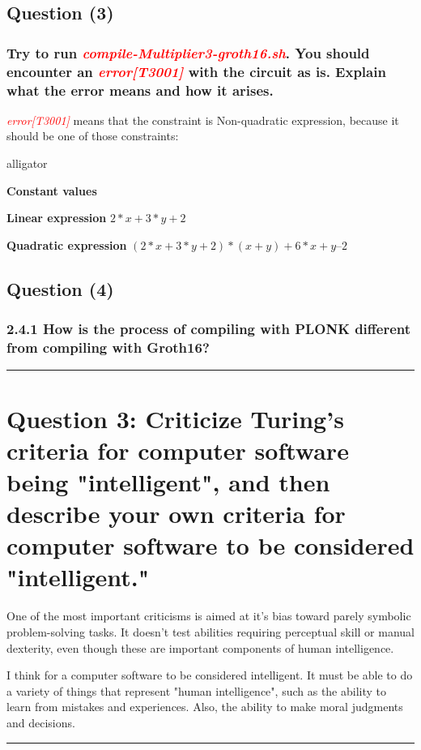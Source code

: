 \documentclass[letterpaper, 10 pt, conference]{ieeeconf}  %
\begin{document}
\subsection{\textbf{Question (3)}}

\subsubsection{\textbf{Try to run \textcolor{red}{\textit{compile-Multiplier3-groth16.sh}}. You should encounter an \textcolor{red}{\textit{error[T3001]}} with the circuit as is. Explain what the error means and how it arises.}}

\textcolor{red}{\textit{error[T3001]}} means that the constraint is Non-quadratic expression, because it should be one of those constraints: 

\begin{labeling}{alligator}
\item [\textbf{Constant values}] 
\item [\textbf{Linear expression}]    $2*x + 3*y + 2$
\item [\textbf{Quadratic expression}] $(2*x + 3*y + 2) * (x+y) + 6*x + y – 2$
\end{labeling}  

\subsection{\textbf{Question (4)}}
\subsubsection{\textbf{2.4.1 How is the process of compiling with PLONK different from compiling with Groth16? }}

\noindent\rule{8cm}{0.4pt}




\section{\textbf{Question 3:} Criticize Turing's criteria for computer software being "intelligent", and then describe
your own criteria for computer software to be considered "intelligent."}
One of the most important criticisms is aimed at it's bias toward parely symbolic problem-solving tasks. It doesn't test abilities requiring perceptual skill or manual dexterity, even though these are important components of human intelligence.

I think for a computer software to be considered intelligent. It must be able to do a variety of things  that represent "human intelligence", such as the ability to learn from mistakes and experiences. Also, the ability to make moral judgments and decisions.
\noindent\rule{8cm}{0.4pt}
\end{document}
